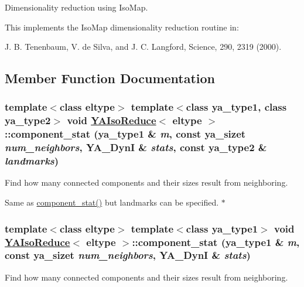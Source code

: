 Dimensionality reduction using Iso\-Map. 

This implements the Iso\-Map dimensionality reduction routine in:

J. B. Tenenbaum, V. de Silva, and J. C. Langford, Science, 290, 2319 (2000). 



\subsection{Member Function Documentation}
\hypertarget{class_y_a_iso_reduce_a16}{
\subsubsection[component\_\-stat]{\setlength{\rightskip}{0pt plus 5cm}template$<$class eltype$>$ template$<$class ya\_\-type1, class ya\_\-type2$>$ void \hyperlink{class_y_a_iso_reduce}{YAIso\-Reduce}$<$ eltype $>$::component\_\-stat (ya\_\-type1 \& {\em m}, const ya\_\-sizet {\em num\_\-neighbors}, YA\_\-Dyn\-I \& {\em stats}, const ya\_\-type2 \& {\em landmarks})}}
\label{class_y_a_iso_reduce_a16}


Find how many connected components and their sizes result from neighboring. 

Same as \hyperlink{class_y_a_iso_reduce_a15}{component\_\-stat()} but landmarks can be specified. $\ast$ \hypertarget{class_y_a_iso_reduce_a15}{
\subsubsection[component\_\-stat]{\setlength{\rightskip}{0pt plus 5cm}template$<$class eltype$>$ template$<$class ya\_\-type1$>$ void \hyperlink{class_y_a_iso_reduce}{YAIso\-Reduce}$<$ eltype $>$::component\_\-stat (ya\_\-type1 \& {\em m}, const ya\_\-sizet {\em num\_\-neighbors}, YA\_\-Dyn\-I \& {\em stats})}}
\label{class_y_a_iso_reduce_a15}


Find how many connected components and their sizes result from neighboring. 

